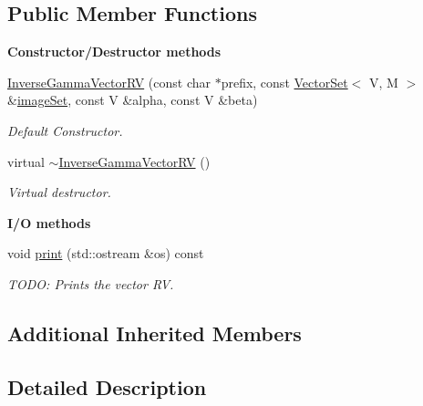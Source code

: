 \subsection*{Public Member Functions}
\begin{Indent}{\bf Constructor/\-Destructor methods}\par
\begin{DoxyCompactItemize}
\item 
\hyperlink{class_q_u_e_s_o_1_1_inverse_gamma_vector_r_v_aff5af0a3d0a73c68d315c15c4e679fbf}{Inverse\-Gamma\-Vector\-R\-V} (const char $\ast$prefix, const \hyperlink{class_q_u_e_s_o_1_1_vector_set}{Vector\-Set}$<$ V, M $>$ \&\hyperlink{class_q_u_e_s_o_1_1_base_vector_r_v_aa4dd2f036228eac1f945bacc7147a922}{image\-Set}, const V \&alpha, const V \&beta)
\begin{DoxyCompactList}\small\item\em Default Constructor. \end{DoxyCompactList}\item 
virtual \hyperlink{class_q_u_e_s_o_1_1_inverse_gamma_vector_r_v_a88e2325c4b2030dce7211a11420269b3}{$\sim$\-Inverse\-Gamma\-Vector\-R\-V} ()
\begin{DoxyCompactList}\small\item\em Virtual destructor. \end{DoxyCompactList}\end{DoxyCompactItemize}
\end{Indent}
\begin{Indent}{\bf I/\-O methods}\par
\begin{DoxyCompactItemize}
\item 
void \hyperlink{class_q_u_e_s_o_1_1_inverse_gamma_vector_r_v_a7c3326d0b39a69f1edd64219f286c7e7}{print} (std\-::ostream \&os) const 
\begin{DoxyCompactList}\small\item\em T\-O\-D\-O\-: Prints the vector R\-V. \end{DoxyCompactList}\end{DoxyCompactItemize}
\end{Indent}
\subsection*{Additional Inherited Members}


\subsection{Detailed Description}
